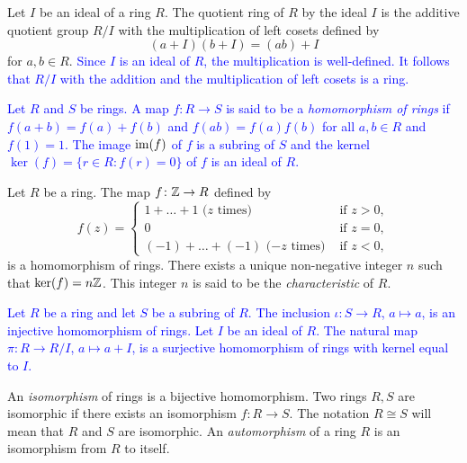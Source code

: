 Let $I$ be an ideal of a ring $R$. The quotient ring of $R$ by the ideal $I$ is the additive quotient group
$R/I$ with the multiplication of left cosets defined by 
\[
(a+I)(b+I)=(ab)+I
\]
for $a,b\in R$. \textcolor{blue}{Since $I$ is an ideal of $R$, the multiplication is well-defined. It follows that 
$R/I$ with the addition and the multiplication of left cosets is a ring.}

\textcolor{blue}{
Let $R$ and $S$ be rings. A map $f\colon R\rightarrow S$
is said to be a {\em homomorphism of rings} if 
$f(a+b)=f(a)+f(b)$ and $f(ab)=f(a)f(b)$ for all $a,b\in R$ and $f(1)=1$.
The image $\operatorname{im}(f)$ of $f$ is a subring of $S$ and the kernel 
$\ker(f)=\{ r\in R: f(r)=0\}$ of $f$ is an ideal of $R$.}

\begin{example}
Let  $R$ be a ring. The map $f\colon \mathbb{Z}\rightarrow R$ defined by
\[
f(z)=\begin{cases}
    1+\dots +1\mbox{ ($z$ times)}&\mbox{ if } z>0,\\
    0 &\mbox{ if } z=0,\\
    (-1)+\dots+(-1) \mbox{ ($-z$ times)}&\mbox{ if } z<0,
    \end{cases}
\]
is a homomorphism of rings. There exists a unique non-negative integer $n$ such that
$\ker(f)=n\mathbb{Z}$. This integer $n$ is said to be the {\em characteristic} of $R$.
\end{example}

\begin{example} 
\textcolor{blue}{Let $R$ be a ring and let $S$ be a subring of $R$. The inclusion $\iota\colon S\rightarrow R$, $a\mapsto a$, is an injective homomorphism of rings. Let $I$ be an ideal of $R$. The natural map $\pi\colon R\rightarrow R/I$, $a\mapsto a+I$, is a surjective homomorphism of rings with kernel equal to $I$.}  
\end{example}


An {\em isomorphism} of rings is a bijective homomorphism. Two rings $R,S$ are isomorphic if there exists an isomorphism $f\colon R\rightarrow S$. The notation $R\cong S$ will mean that $R$ and $S$ are isomorphic. An {\em automorphism} of a ring $R$ is an isomorphism from $R$ to itself. 

